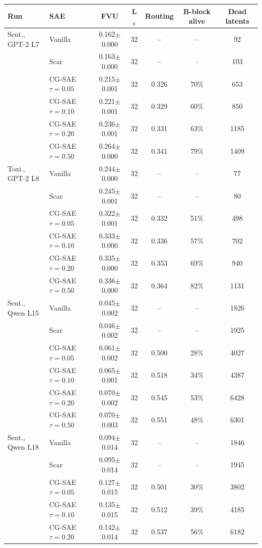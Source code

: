 \begin{tabular}{@{}ll ccccc@{}}
\toprule
Run & SAE & FVU & L$_0$ & Routing & B-block alive & Dead latents \\
\midrule
Sent., GPT-2 L7 & Vanilla & 0.162$\pm$0.000 & 32 & -- & -- & 92 \\
 & Scar & 0.163$\pm$0.000 & 32 & -- & -- & 103 \\
 & CG-SAE $\tau=0.05$ & 0.215$\pm$0.001 & 32 & 0.326 & 70\% & 653 \\
 & CG-SAE $\tau=0.10$ & 0.221$\pm$0.001 & 32 & 0.329 & 60\% & 850 \\
 & CG-SAE $\tau=0.20$ & 0.236$\pm$0.001 & 32 & 0.331 & 63\% & 1185 \\
 & CG-SAE $\tau=0.50$ & 0.264$\pm$0.000 & 32 & 0.341 & 79\% & 1409 \\
\addlinespace[3pt]
Toxi., GPT-2 L8 & Vanilla & 0.244$\pm$0.000 & 32 & -- & -- & 77 \\
 & Scar & 0.245$\pm$0.001 & 32 & -- & -- & 80 \\
 & CG-SAE $\tau=0.05$ & 0.322$\pm$0.001 & 32 & 0.332 & 51\% & 498 \\
 & CG-SAE $\tau=0.10$ & 0.333$\pm$0.000 & 32 & 0.336 & 57\% & 702 \\
 & CG-SAE $\tau=0.20$ & 0.335$\pm$0.000 & 32 & 0.353 & 69\% & 940 \\
 & CG-SAE $\tau=0.50$ & 0.336$\pm$0.000 & 32 & 0.364 & 82\% & 1131 \\
\addlinespace[3pt]
Sent., Qwen L15 & Vanilla & 0.045$\pm$0.002 & 32 & -- & -- & 1826 \\
 & Scar & 0.046$\pm$0.002 & 32 & -- & -- & 1925 \\
 & CG-SAE $\tau=0.05$ & 0.061$\pm$0.002 & 32 & 0.500 & 28\% & 4027 \\
 & CG-SAE $\tau=0.10$ & 0.065$\pm$0.001 & 32 & 0.518 & 34\% & 4387 \\
 & CG-SAE $\tau=0.20$ & 0.070$\pm$0.002 & 32 & 0.545 & 53\% & 6428 \\
 & CG-SAE $\tau=0.50$ & 0.070$\pm$0.003 & 32 & 0.551 & 48\% & 6301 \\
\addlinespace[3pt]
Sent., Qwen L18 & Vanilla & 0.094$\pm$0.014 & 32 & -- & -- & 1846 \\
 & Scar & 0.095$\pm$0.014 & 32 & -- & -- & 1945 \\
 & CG-SAE $\tau=0.05$ & 0.127$\pm$0.015 & 32 & 0.501 & 30\% & 3802 \\
 & CG-SAE $\tau=0.10$ & 0.135$\pm$0.015 & 32 & 0.512 & 39\% & 4185 \\
 & CG-SAE $\tau=0.20$ & 0.142$\pm$0.014 & 32 & 0.537 & 56\% & 6182 \\

\end{tabular}
